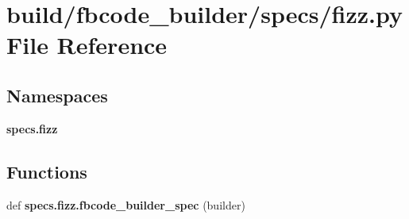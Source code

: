 \section{build/fbcode\+\_\+builder/specs/fizz.py File Reference}
\label{fizz_8py}
\subsection*{Namespaces}
\begin{DoxyCompactItemize}
\item 
 {\bf specs.\+fizz}
\end{DoxyCompactItemize}
\subsection*{Functions}
\begin{DoxyCompactItemize}
\item 
def {\bf specs.\+fizz.\+fbcode\+\_\+builder\+\_\+spec} (builder)
\end{DoxyCompactItemize}
